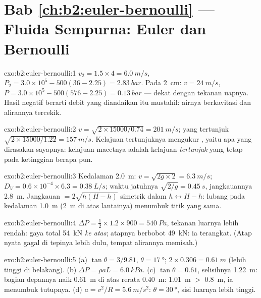 \section*{Bab \ref{ch:b2:euler-bernoulli} --- Fluida Sempurna: Euler dan Bernoulli}

\begin{solution}{exo:b2:euler-bernoulli:1}
$v_2 = 1.5 \times 4 = \qty{6.0}{m/s}$, $P_2 = 3.0 \times 10^5 - 500(36 - 2.25) =
\qty{2.83}{bar}$. Pada \qty{2}{cm}: $v = \qty{24}{m/s}$, $P = 3.0 \times 10^5 - 500
(576 - 2.25) = \qty{0.13}{bar}$ --- dekat dengan tekanan uapnya. Hasil negatif
berarti debit yang diandaikan itu mustahil: airnya berkavitasi
dan alirannya tercekik.
\end{solution}

\begin{solution}{exo:b2:euler-bernoulli:2}
$v = \sqrt{2 \times 15000/0.74} = \qty{201}{m/s}$; yang tertunjuk $\sqrt{2 \times 15000/
1.22} = \qty{157}{m/s}$. Kelajuan tertunjuknya mengukur ,
yaitu apa yang dirasakan sayapnya: kelajuan macetnya adalah kelajuan
\emph{tertunjuk} yang tetap pada ketinggian berapa pun.
\end{solution}

\begin{solution}{exo:b2:euler-bernoulli:3}
Kedalaman \qty{2.0}{m}: $v = \sqrt{2g \times 2} = \qty{6.3}{m/s}$; $D_V = 0.6 \times 10^{-4}
\times 6.3 = \qty{0.38}{L/s}$; waktu jatuhnya $\sqrt{2/g} = \qty{0.45}{s}$, jangkauannya
\qty{2.8}{m}. Jangkauan $= 2\sqrt{h(H - h)}$ simetrik dalam $h \leftrightarrow H -
h$: lubang pada kedalaman \qty{1.0}{m} (\qty{2}{m} di atas lantainya) menumbuk titik
yang sama.
\end{solution}

\begin{solution}{exo:b2:euler-bernoulli:4}
$\Delta P = \tfrac12 \times 1.2 \times 900 = \qty{540}{Pa}$, tekanan luarnya lebih rendah:
gaya total \qty{54}{kN} \emph{ke atas}; atapnya berbobot \qty{49}{kN}: ia
terangkat. (Atap nyata gagal di tepinya lebih dulu, tempat alirannya memisah.)
\end{solution}

\begin{solution}{exo:b2:euler-bernoulli:5}
(a) $\tan\theta = 3/9.81$, $\theta = \qty{17}{\degree}$; $2 \times 0.306 = \qty{0.61}{m}$
(lebih tinggi di belakang). (b) $\Delta P = \rho aL = \qty{6.0}{kPa}$. (c) $\tan\theta =
0.61$, selisihnya \qty{1.22}{m}: bagian depannya naik \qty{0.61}{m} di atas rerata
\qty{0.40}{m}: \qty{1.01}{m} $>$ \qty{0.8}{m}, ia menumbuk tutupnya. (d) $a = v^2/R =
\qty{5.6}{m/s^2}$: $\theta = \qty{30}{\degree}$, sisi luarnya lebih tinggi.
\end{solution}

